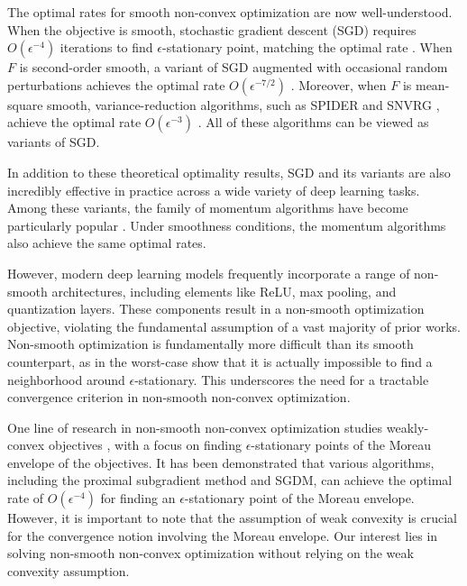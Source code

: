 The optimal rates for smooth non-convex optimization are now well-understood. When the objective is smooth, stochastic gradient descent (SGD) requires $O(\epsilon^{-4})$ iterations to find $\epsilon$-stationary point, matching the optimal rate \cite{arjevani2019lower}. When $F$ is second-order smooth, a variant of SGD augmented with occasional random perturbations achieves the optimal rate $O(\epsilon^{-7/2})$ \cite{fang2019sharp, arjevani2020second}. Moreover, when $F$ is mean-square smooth, variance-reduction algorithms, such as SPIDER \cite{fang2018spider} and SNVRG \cite{zhou2018stochastic}, achieve the optimal rate $O(\epsilon^{-3})$ \cite{arjevani2019lower}. All of these algorithms can be viewed as variants of SGD.

In addition to these theoretical optimality results, SGD and its variants are also incredibly effective in practice across a wide variety of deep learning tasks. Among these variants, the family of momentum algorithms have become particularly popular \cite{sutskever2013importance, kingma2014adam, you2017scaling, you2019large, cutkosky2019momentum, cutkosky2020momentum, ziyin2020laprop}. Under smoothness conditions, the momentum algorithms also achieve the same optimal rates.

However, modern deep learning models frequently incorporate a range of non-smooth architectures, including elements like ReLU, max pooling, and quantization layers. These components result in a non-smooth optimization objective, violating the fundamental assumption of a vast majority of prior works. Non-smooth optimization is fundamentally more difficult than its smooth counterpart, as in  the worst-case \citet{kornowski2022oracle} show that it is actually  impossible to find a neighborhood around $\epsilon$-stationary. This underscores the need for a tractable convergence criterion in non-smooth non-convex optimization.

One line of research in non-smooth non-convex optimization studies weakly-convex objectives \citep{davis2019stochastic, mai2020convergence}, with a focus on finding $\epsilon$-stationary points of the Moreau envelope of the objectives. It has been demonstrated that various algorithms, including the proximal subgradient method and SGDM, can achieve the optimal rate of $O(\epsilon^{-4})$ for finding an $\epsilon$-stationary point of the Moreau envelope. However, it is important to note that the assumption of weak convexity is crucial for the convergence notion involving the Moreau envelope. Our interest lies in solving non-smooth non-convex optimization without relying on the weak convexity assumption.

